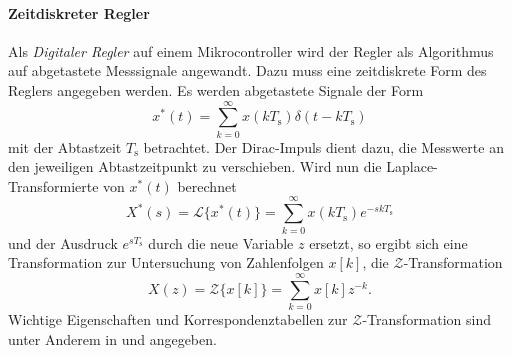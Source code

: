 \paragraph{Zeitdiskreter Regler}\label{par:ZeitdiskreterRegler}
Als \emph{Digitaler Regler} auf einem Mikrocontroller wird der Regler als Algorithmus auf abgetastete Messsignale angewandt. Dazu muss eine zeitdiskrete Form des Reglers angegeben werden. Es werden abgetastete Signale der Form \begin{equation}
    x^*(t) = \sum_{k=0}^\infty x(kT_{\mathrm{s}})\delta(t-kT_{\mathrm{s}})
\end{equation} mit der Abtastzeit $T_{\mathrm{s}}$ betrachtet. Der Dirac-Impuls dient dazu, die Messwerte an den jeweiligen Abtastzeitpunkt zu verschieben. Wird nun die Laplace-Transformierte von $x^*(t)$ berechnet 
\begin{equation}
    X^*(s) = \mathcal{L}\{x^*(t)\} = \sum_{k=0}^\infty x(kT_{\mathrm{s}})e^{-skT_{\mathrm{s}}} 
\end{equation}
und der Ausdruck $e^{sT_{\mathrm{s}}}$ durch die neue Variable $z$ ersetzt, so ergibt sich eine Transformation zur Untersuchung von Zahlenfolgen $x[k]$, die $\mathcal{Z}$-Transformation
\begin{equation}
    X(z) = \mathcal{Z}\{x[k]\} = \sum_{k=0}^\infty x[k]z^{-k}.
\end{equation} Wichtige Eigenschaften und Korrespondenztabellen zur $\mathcal{Z}$-Transformation sind unter Anderem in \cite{mbihiTableZtransforms2018} und \cite[S.~112-114]{unbehauenRegelungstechnikZustandsregelungenDigitale2009} angegeben.


